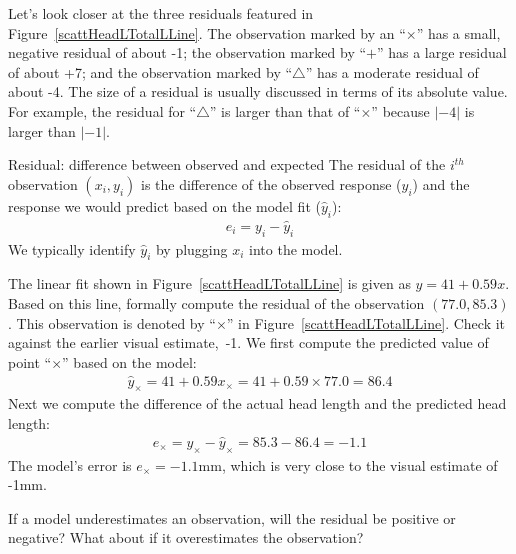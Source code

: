 Let's look closer at the three residuals featured in
Figure~\ref{scattHeadLTotalLLine}.
The observation marked by an ``$\times$'' has a small,
negative residual of about -1;
the observation marked by ``$+$'' has a large residual of about +7;
and the observation marked by ``$\triangle$'' has a moderate
residual of about -4.
The size of a residual is usually discussed in terms of its
absolute value.
For example, the residual for ``$\triangle$'' is larger than
that of ``$\times$'' because $|-4|$ is larger than $|-1|$.

\begin{onebox}{Residual: difference between observed and expected}
The residual of the $i^{th}$ observation $(x_i, y_i)$ is the difference of the observed response ($y_i$) and the response we would predict based on the model fit ($\hat{y}_i$):
\begin{eqnarray*}
e_i = y_i - \hat{y}_i
\end{eqnarray*}
We typically identify $\hat{y}_i$ by plugging $x_i$ into the model.
\end{onebox}

\begin{examplewrap}
\begin{nexample}{The linear fit shown in Figure~\ref{scattHeadLTotalLLine} is given as $\hat{y} = 41 + 0.59x$. Based on this line, formally compute the residual of the observation $(77.0, 85.3)$. This observation is denoted by ``$\times$'' in Figure~\ref{scattHeadLTotalLLine}.
Check it against the earlier visual estimate,~-1.}
We first compute the predicted value of point ``$\times$'' based on the model:
\begin{eqnarray*}
\hat{y}_{\times} = 41+0.59x_{\times} = 41+0.59\times 77.0 = 86.4
\end{eqnarray*}
Next we compute the difference of the actual head length and the predicted head length:
\begin{eqnarray*}
e_{\times} = y_{\times} - \hat{y}_{\times} = 85.3 -  86.4 = -1.1
\end{eqnarray*}
The model's error is $e_{\times} = -1.1$mm,
which is very close to the visual estimate of -1mm.
\end{nexample}
\end{examplewrap}

\begin{exercisewrap}
\begin{nexercise}
If a model underestimates an observation, will the residual be positive or negative? What about if it overestimates the observation?\footnotemark
\end{nexercise}
\end{exercisewrap}

